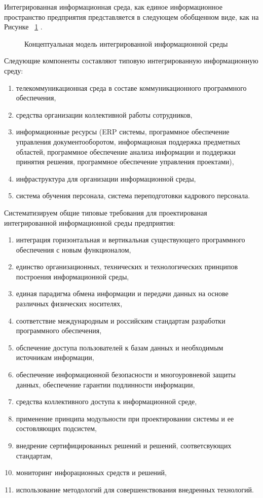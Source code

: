 Интегрированная информационная среда, как единое информационное пространство предприятия представляется в следующем обобщенном виде, как на Рисунке ~\cref{fig:ITembeddedspace} \cite{ITclass}.

\begin{figure}[ht1]
    \caption{Концептуальная модель интегрированной информационной среды}\label{fig:ITembeddedspace}
\end{figure}

Следующие компоненты составляют типовую интегрированную информационную среду:
\begin{enumerate}
	\item телекоммуникационная среда в составе коммуникационного программного обеспечения,
	\item средства организации коллективной работы сотрудников,
	\item информационные ресурсы (ERP системы, программное обеспечение управления документооборотом, информационая поддержка предметных областей, программное обеспечение анализа информации и поддержки принятия решения, программное обеспечение управления проектами),
	\item инфраструктура для организации информационной среды,
	\item система обучения персонала, система переподготовки кадрового персонала.
\end{enumerate}
Систематизируем общие типовые требования для проектированая интегрированной информационной среды предприятия:
\begin{enumerate}
	\item интеграция горизонтальная и вертикальная существующего программного обеспечения с новым функционалом,
	\item единство организационных, технических и технологических принципов построения информационной среды,
	\item единая парадигма обмена информации и передачи данных на основе различных физических носителях,
	\item соответствие международным и российским стандартам разработки программного обеспечения,
	\item обспечение доступа пользователей к базам данных и необходимым источникам информации,
	\item обеспечение информационной безопасности и многоуровневой защиты данных, обеспечение гарантии подлинности информации,
	\item средства коллективного доступа к информационной среде,
	\item применение принципа модульности при проектировании системы и ее состовляющих подсистем,
	\item внедрение сертифицированных решений и решений, соответсвующих стандартам,
	\item мониторинг инфорационных средств и решений,
	\item использование методологий для совершенствования внедренных технологий.
\end{enumerate}
